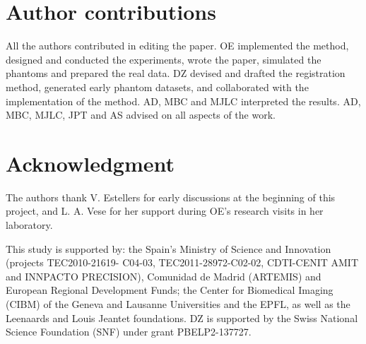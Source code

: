 \section*{Author contributions}
All the authors contributed in editing the paper.
OE implemented the method, designed and conducted the experiments, wrote the paper,
  simulated the phantoms and prepared the real data.
DZ devised and drafted the registration method, generated early phantom datasets, and
  collaborated with the implementation of the method.
AD, MBC and MJLC interpreted the results.
AD, MBC, MJLC, JPT and AS advised on all aspects of the work.

\section*{Acknowledgment}
The authors thank V. Estellers for early discussions at the beginning of this project,
  and L. A. Vese for her support during OE's research visits in her laboratory.

This study is supported by: the Spain's Ministry of Science and Innovation
  (projects TEC2010-21619- C04-03, TEC2011-28972-C02-02, CDTI-CENIT
  AMIT and INNPACTO PRECISION), Comunidad de Madrid (ARTEMIS) and
  European Regional Development Funds; the Center for Biomedical Imaging
  (CIBM) of the Geneva and Lausanne Universities and the EPFL, as well as the
  Leenaards and Louis Jeantet foundations.
DZ is supported by the Swiss National Science Foundation (SNF) under grant PBELP2-137727.
